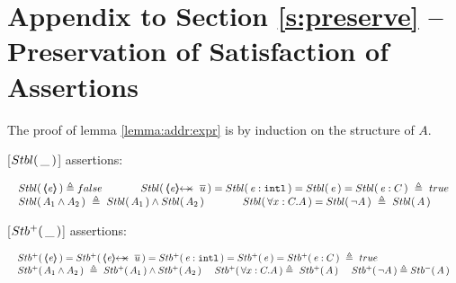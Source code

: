 \section{Appendix to Section \ref{s:preserve} -- Preservation of Satisfaction of Assertions}
\label{app:preserve}

The proof of lemma \ref{lemma:addr:expr} is by induction on the structure of $A$.

\vspace{.2cm}

\begin{definition}
\label{def:Basic}
[${Stbl(\, \_\, )}$] assertions: %

$
\begin{array}{l}
 \begin{array}{lll}
  \Stable {\inside{\re}}  \triangleq  false & \lclSPACE &   \Stable {\protectedFrom \re {\overline {u}}} =  
  \Stable  {\internal \re} =  %
    \Stable {\re}=   
     \Stable {\re:C}\   \triangleq \    true
 \end{array}
  \\
 \begin{array}{lcl}
 \Stable  {A_1  \wedge  A_2}\  \triangleq\     \Stable  { A_1}  \wedge    \Stable  {A_2}    &
\lclSPACE  &  
 \Stable  {\forall x:C.A} =\Stable  {\neg A} \   \triangleq\   \Stable A
 \end{array}
 \end{array}
$
\label{f:Basic}
 \end{definition}


 \begin{definition}
[${Stb^+(\, \_\, )}$] assertions: %

$
\begin{array}{l}
 \begin{array}{l}
  \Pos {\inside{\re}} =  \Pos {\protectedFrom \re {\overline {u}}} =  
  \Pos  {\internal \re} =   
    \Pos {\re}=   
     \Pos {\re:C}\   \triangleq \    true
 \end{array}
  \\
 \begin{array}{lll}
 \Pos  {A_1  \wedge  A_2}\  \triangleq\     \Pos  { A_1}  \wedge    \Pos  {A_2}   \  &    
 \Pos  {\forall x:C.A}   \triangleq\   \Pos A
\   &
  \Pos {\neg A}  \triangleq \Neg A
 \end{array}
 \end{array}
 $
 \label{def:Pos}
\end{definition}

